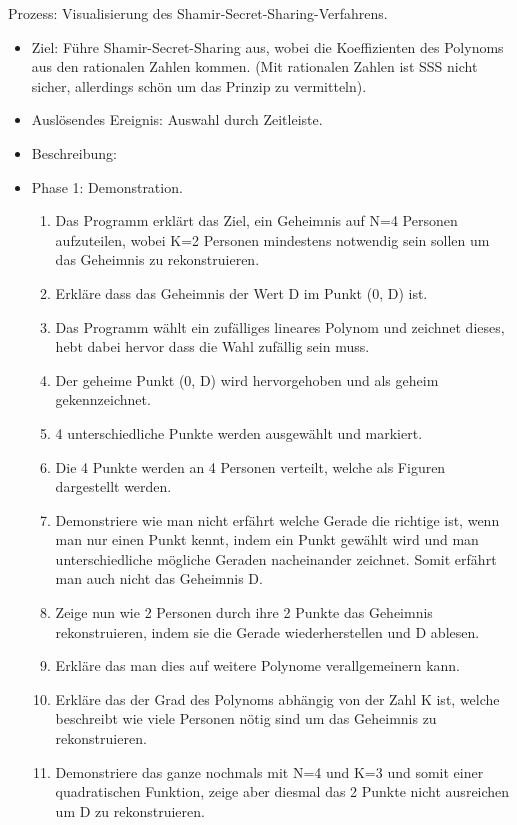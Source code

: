 \documentclass{article}
\begin{document}
\begin{FA}[start=900]
 \item Prozess: Visualisierung des Shamir-Secret-Sharing-Verfahrens.
\end{FA}
\begin{itemize}[label={}]

 \item Ziel: Führe Shamir-Secret-Sharing aus, wobei die Koeffizienten des Polynoms 
aus den rationalen Zahlen kommen. (Mit rationalen Zahlen ist SSS nicht sicher, 
allerdings schön um das Prinzip zu vermitteln).

 \item Auslösendes Ereignis: Auswahl durch Zeitleiste.

 \item Beschreibung:

 \item Phase 1: Demonstration.

	\begin{enumerate}[]
     \item Das Programm erklärt das Ziel,
        ein Geheimnis auf N=4 Personen aufzuteilen,
        wobei K=2 Personen mindestens notwendig sein sollen um
        das Geheimnis zu rekonstruieren.
     \item Erkläre dass das Geheimnis der Wert
        D im Punkt (0, D) ist.
     \item Das Programm wählt ein zufälliges lineares Polynom
        und zeichnet dieses, hebt dabei hervor dass die Wahl
        zufällig sein muss.
     \item Der geheime Punkt (0, D)
        wird hervorgehoben
        und als geheim gekennzeichnet.
     \item 4 unterschiedliche Punkte werden ausgewählt
        und markiert.
     \item Die 4 Punkte werden an 4 Personen
        verteilt, welche als Figuren dargestellt
        werden.
     \item Demonstriere wie man nicht erfährt
        welche Gerade die richtige ist, wenn
        man nur einen Punkt kennt, indem
        ein Punkt gewählt wird und man
        unterschiedliche mögliche Geraden
        nacheinander zeichnet.
        Somit erfährt man auch nicht
        das Geheimnis D.
     \item Zeige nun wie 2 Personen
        durch ihre 2 Punkte das Geheimnis rekonstruieren,
        indem sie die Gerade wiederherstellen und D ablesen.
     \item Erkläre das man dies auf weitere Polynome
        verallgemeinern kann.
     \item Erkläre das der Grad des Polynoms
        abhängig von der Zahl K ist, welche
        beschreibt wie viele Personen nötig
        sind um das Geheimnis zu rekonstruieren.
     \item Demonstriere das ganze nochmals mit N=4
        und K=3 und somit einer quadratischen Funktion,
        zeige aber diesmal das 2 Punkte nicht ausreichen
        um D zu rekonstruieren.
	\end{enumerate}


\end{itemize}
\end{document}
